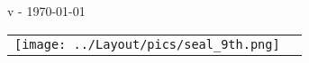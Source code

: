 
\begin{titlepage}
\begin{center}

\ifdef{\booktitle}{}{\newcommand{\booktitle}{Missing title}}
\ifdef{\version}{}{\newcommand{\version}{Missing version}}

{\titlefont\fontsize{40}{48}\selectfont\noindent{}

}

\vspace*{0.5cm}

\vspace*{-1cm}
{\titlefont\fontsize{50}{60}\selectfont \booktitle
\vspace{0.4cm}

\fontsize{14}{16.8}\selectfont v\version{} - \today{}}

\vfill

\begin{tabular}{@{}m{2cm}@{\hskip 20pt}m{13cm}@{}}
\texttt{[image: ../Layout/pics/seal\_9th.png]} &
{\fontsize{10}{12}\selectfont \textcolor{black!50}{\noindent{}}}

\ifdef{\frontpageaddstuff}{{\fontsize{10}{12}\selectfont \noindent\textcolor{black!50}{\frontpageaddstuff}}}{}

\vspace*{10pt}
\noindent{\fontsize{10}{12}\selectfont \textcolor{black!50}{\labels@license}}
\tabularnewline
\end{tabular}


\end{center}


\end{titlepage}

\restoregeometry